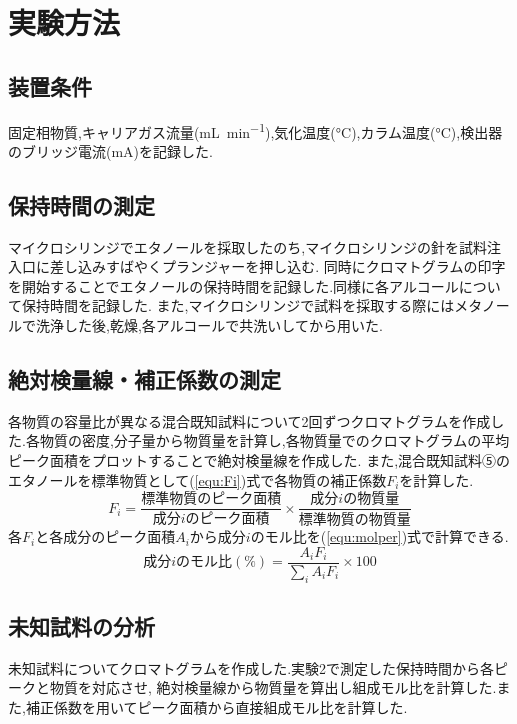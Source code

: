 \section{実験方法}
\subsection{装置条件}
固定相物質,キャリアガス流量(\si{\milli L.min^{-1}}),気化温度(\si{\degreeCelsius}),カラム温度(\si{\degreeCelsius}),検出器のブリッジ電流(\si{\milli\ampere})を記録した.
\subsection{保持時間の測定}
マイクロシリンジでエタノールを採取したのち,マイクロシリンジの針を試料注入口に差し込みすばやくプランジャーを押し込む.
同時にクロマトグラムの印字を開始することでエタノールの保持時間を記録した.同様に各アルコールについて保持時間を記録した.
また,マイクロシリンジで試料を採取する際にはメタノールで洗浄した後,乾燥,各アルコールで共洗いしてから用いた.
\subsection{絶対検量線・補正係数の測定}
各物質の容量比が異なる混合既知試料について2回ずつクロマトグラムを作成した.各物質の密度,分子量から物質量を計算し,各物質量でのクロマトグラムの平均ピーク面積をプロットすることで絶対検量線を作成した.
また,混合既知試料⑤のエタノールを標準物質として(\ref{equ:Fi})式で各物質の補正係数$F_i$を計算した.
\begin{equation}
  \label{equ:Fi}
  F_i=\frac{標準物質のピーク面積}{成分iのピーク面積}\times\frac{成分iの物質量}{標準物質の物質量}
\end{equation}
各$F_i$と各成分のピーク面積$A_i$から成分$i$のモル比を(\ref{equ:molper})式で計算できる.
\begin{equation}
  \label{equ:molper}
  成分iのモル比(\%)=\frac{A_i F_i}{\sum_i A_i F_i}\times100
\end{equation}
\subsection{未知試料の分析}
未知試料についてクロマトグラムを作成した.実験2で測定した保持時間から各ピークと物質を対応させ,
絶対検量線から物質量を算出し組成モル比を計算した.また,補正係数を用いてピーク面積から直接組成モル比を計算した.


